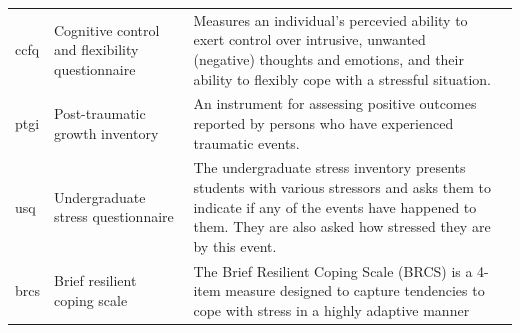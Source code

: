\documentclass[]{book}
\begin{document}
\begin{longtable}[]{@{}llll@{}}
\begin{minipage}[t]{0.22\columnwidth}
ccfq\strut
\end{minipage} & \begin{minipage}[t]{0.27\columnwidth}\raggedright
Cognitive control and flexibility questionnaire\strut
\end{minipage} & \begin{minipage}[t]{0.22\columnwidth}\raggedright
Measures an individual's percevied ability to exert control over intrusive, unwanted (negative) thoughts and emotions, and their ability to flexibly cope with a stressful situation.\strut
\end{minipage} & \begin{minipage}[t]{0.18\columnwidth}\raggedright
\strut
\end{minipage}\tabularnewline
\begin{minipage}[t]{0.22\columnwidth}\raggedright
ptgi\strut
\end{minipage} & \begin{minipage}[t]{0.27\columnwidth}\raggedright
Post-traumatic growth inventory\strut
\end{minipage} & \begin{minipage}[t]{0.22\columnwidth}\raggedright
An instrument for assessing positive outcomes reported by persons who have experienced traumatic events.\strut
\end{minipage} & \begin{minipage}[t]{0.18\columnwidth}\raggedright
\strut
\end{minipage}\tabularnewline
\begin{minipage}[t]{0.22\columnwidth}\raggedright
usq\strut
\end{minipage} & \begin{minipage}[t]{0.27\columnwidth}\raggedright
Undergraduate stress questionnaire\strut
\end{minipage} & \begin{minipage}[t]{0.22\columnwidth}\raggedright
The undergraduate stress inventory presents students with various stressors and asks them to indicate if any of the events have happened to them. They are also asked how stressed they are by this event.\strut
\end{minipage} & \begin{minipage}[t]{0.18\columnwidth}\raggedright
\strut
\end{minipage}\tabularnewline
\begin{minipage}[t]{0.22\columnwidth}\raggedright
brcs\strut
\end{minipage} & \begin{minipage}[t]{0.27\columnwidth}\raggedright
Brief resilient coping scale\strut
\end{minipage} & \begin{minipage}[t]{0.22\columnwidth}\raggedright
The Brief Resilient Coping Scale (BRCS) is a 4-item measure designed to capture tendencies to cope with stress in a highly adaptive manner\strut
\end{minipage} & \begin{minipage}[t]{0.18\columnwidth}\raggedright
\strut
\end{minipage}\tabularnewline
\bottomrule
\end{longtable}
\end{document}
